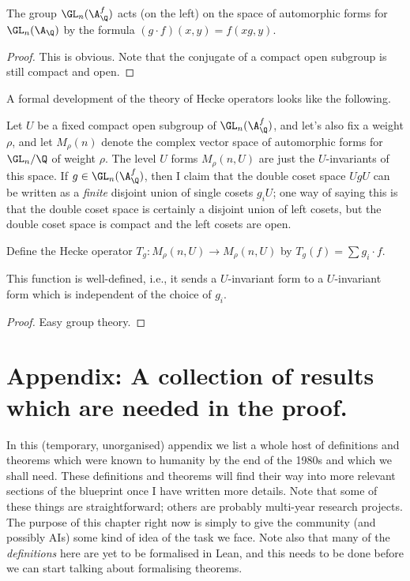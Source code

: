 \begin{lemma} The group $\GL_n(\A_{\Q}^f)$ acts (on the left) on the space of automorphic forms
  for $\GL_n(\A_{\Q})$ by the formula $(g\cdot f)(x,y)=f(xg,y)$.
\end{lemma}
\begin{proof}
  This is obvious. Note that the conjugate of a compact open subgroup is still
  compact and open.
\end{proof}

A formal development of the theory of Hecke operators looks like the following.

Let $U$ be a fixed compact open subgroup of $\GL_n(\A_{\Q}^f)$, and let's also fix
a weight $\rho$, and let $M_\rho(n)$ denote the complex vector space of automorphic
forms for $\GL_n/\Q$ of weight $\rho$. The level $U$ forms $M_\rho(n,U)$ are just the $U$-invariants
of this space. If $g\in\GL_n(\A_{\Q}^f)$, then I
claim that the double coset space $UgU$ can be written as a \emph{finite} disjoint union
of single cosets $g_iU$; one way of saying this is that the double coset space is certainly
a disjoint union of left cosets, but the double coset space is compact and the left cosets
are open.

Define the Hecke operator $T_g:M_\rho(n,U)\to M_\rho(n,U)$ by
$T_g(f)=\sum g_i\cdot f$.

\begin{lemma} This function is well-defined, i.e., it sends a $U$-invariant form to
  a $U$-invariant form which is independent of the choice of $g_i$.
\end{lemma}
\begin{proof} Easy group theory.
\end{proof}


\chapter{Appendix: A collection of results which are needed in the proof.}\label{ch_bestiary}

In this (temporary, unorganised) appendix we list a whole host of definitions and theorems which were known to humanity by the end of the 1980s and which we shall need. These definitions and theorems will find their way into more relevant sections of the blueprint once I have written more details. Note that some of these things are straightforward; others are probably multi-year research projects. The purpose of this chapter right now is simply to give the community (and possibly AIs) some kind of idea of the task we face. Note also that many of the \emph{definitions} here are yet to be formalised in Lean, and this needs to be done before we can start talking about formalising theorems.

